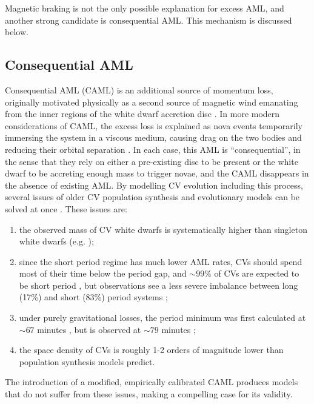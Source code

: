 Magnetic braking is not the only possible explanation for excess AML, and another strong candidate is consequential AML. This mechanism is discussed below.


\subsection{Consequential AML}
\label{sect:introduction:CAML}

Consequential AML (CAML) is an additional source of momentum loss, originally motivated physically as a second source of magnetic wind emanating from the inner regions of the white dwarf accretion disc \citep{king1995,schenker1998}. In more modern considerations of CAML, the excess loss is explained as nova events temporarily immersing the system in a viscous medium, causing drag on the two bodies and reducing their orbital separation \citep{Schreiber2016}.
In each case, this AML is ``consequential'', in the sense that they rely on either a pre-existing disc to be present or the white dwarf to be accreting enough mass to trigger novae, and the CAML disappears in the absence of existing AML.
By modelling CV evolution including this process, several issues of older CV population synthesis and evolutionary models can be solved at once \citep{Schreiber2016}. These issues are:
\begin{enumerate}
    \item the observed mass of CV white dwarfs is systematically higher than singleton white dwarfs (e.g. \citealt{McAllister2019,pala2020});
    \item since the short period regime has much lower AML rates, CVs should spend most of their time below the period gap, and $\sim 99\%$ of CVs are expected to be short period \citep{kolb1993a}, but observations see a less severe imbalance between long (17\%) and short (83\%) period systems \citep{pala2020};
    \item under purely gravitational losses, the period minimum was first calculated at $\sim 67$ minutes \citep{kolb99}, but is observed at $\sim 79$ minutes \citep{McAllister2019};
    \item the space density of CVs is roughly 1-2 orders of magnitude lower than population synthesis models predict.
\end{enumerate}
The introduction of a modified, empirically calibrated CAML produces models that do not suffer from these issues, making a compelling case for its validity.

